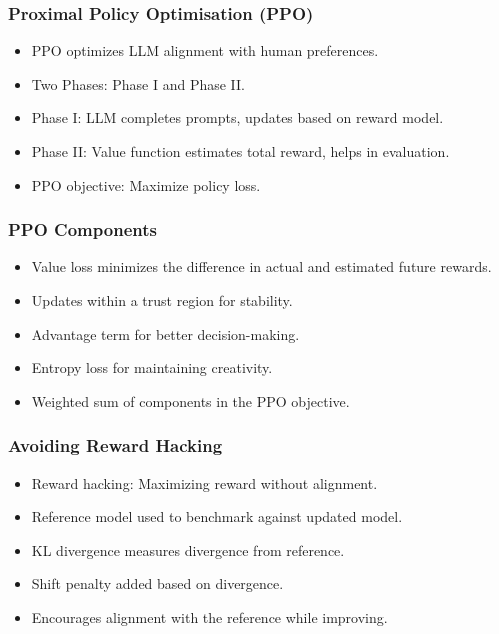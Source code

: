 \begin{frame}[fragile]\frametitle{Proximal Policy Optimisation (PPO)}
\begin{itemize}
    \item PPO optimizes LLM alignment with human preferences.
    \item Two Phases: Phase I and Phase II.
    \item Phase I: LLM completes prompts, updates based on reward model.
    \item Phase II: Value function estimates total reward, helps in evaluation.
    \item PPO objective: Maximize policy loss.
\end{itemize}
\end{frame}

\begin{frame}[fragile]\frametitle{PPO Components}
\begin{itemize}
    \item Value loss minimizes the difference in actual and estimated future rewards.
    \item Updates within a trust region for stability.
    \item Advantage term for better decision-making.
    \item Entropy loss for maintaining creativity.
    \item Weighted sum of components in the PPO objective.
\end{itemize}
\end{frame}

\begin{frame}[fragile]\frametitle{Avoiding Reward Hacking}
\begin{itemize}
    \item Reward hacking: Maximizing reward without alignment.
    \item Reference model used to benchmark against updated model.
    \item KL divergence measures divergence from reference.
    \item Shift penalty added based on divergence.
    \item Encourages alignment with the reference while improving.
\end{itemize}
\end{frame}

